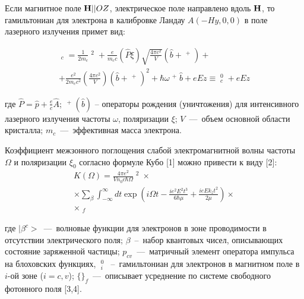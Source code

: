 {Если магнитное поле $\boldsymbol{\mathbf{H}}||OZ$, электрическое поле направлено вдоль $\boldsymbol{\mathbf{H}}$, то гамильтониан для электрона в калибровке Ландау $A(-Hy,0,0)$ в поле лазерного излучения примет вид:

\begin{multline} \label{eq:22_10} 
\mathop{\hat{H}}\nolimits_{c} =\frac{1}{2m_{c} } \mathop{\hat{P}}\nolimits^{2} +\frac{e}{m_{c} c} (\hat{P}\xi )\sqrt{\frac{4\pi c^{2} }{V} } (\hat{b}+\mathop{\hat{b}}\nolimits^{+} )+ \\ 
+\frac{e^{2} }{2m_{c} c^{2} } \left(\frac{4\pi c^{2} }{V} \right)(\hat{b}+\mathop{\hat{b}}\nolimits^{+} )^{2} +\hbar \omega \mathop{\hat{b}}\nolimits^{+} \hat{b}+eEz\equiv \mathop{\hat{H}}\nolimits_{c}^{0} +eEz
\end{multline}
 
где $\hat{P}=\hat{p}+\frac{e}{c} \hat{A}$; $\mathop{\hat{b}}\nolimits^{+} (\hat{b})$ -- операторы рождения (уничтожения) для интенсивного лазерного излучения частоты $\omega $, поляризации $\xi $; $V$~---~объем основной области кристалла; $m_{c} $~---~эффективная масса электрона.

Коэффициент межзонного поглощения слабой электромагнитной волны частоты $\Omega $ и поляризации $\xi _{0} $ согласно формуле Кубо \cite{Kubo1957a}[1] можно привести к виду \cite{Sokovnich2004}[2]:
\begin{multline} \label{eq:22_20} 
K(\Omega )=\frac{4\pi e^{2} }{Vn_{0} c\hbar \Omega } \mathop{\left|\frac{p_{cv} \xi _{0} }{m_{0} } \right|}\nolimits^{2} \times  \\
\times \sum _{\beta } \int _{-\infty }^{\infty}  dt \exp \left(i\Omega t-\frac{ie^{2} E^{2} t^{3} }{6\hbar \mu } +\frac{ieEk_{z} t^{2} }{2\mu } \right)\times  \\ 
\times \mathop{\left\{<\beta ^{c} |\exp \left(\frac{it}{\hbar } \mathop{\hat{H}}\nolimits_{v}^{0} \right)\exp \left(-\frac{it}{\hbar } \mathop{\hat{H}}\nolimits_{c}^{0} \right)|\beta ^{c} >\right\}}\nolimits_{f}  
\end{multline} 

где $|\beta ^{c} >$~---~волновые функции для электронов в зоне проводимости в отсутствии электрического поля; $\beta $~--~набор квантовых чисел, описывающих состояние заряженной частицы; $p_{cv} $~---~матричный элемент оператора импульса на блоховских функциях, $\mathop{\hat{H}}\nolimits_{i}^{0} $~--~гамильтониан для электронов в магнитном поле в $i$-ой зоне ($i=c,v$); $\{ \} _{f} $~---~описывает усреднение по системе свободного фотонного поля \cite{Glauber1963,Klauder1968}[3,4]. 

}
